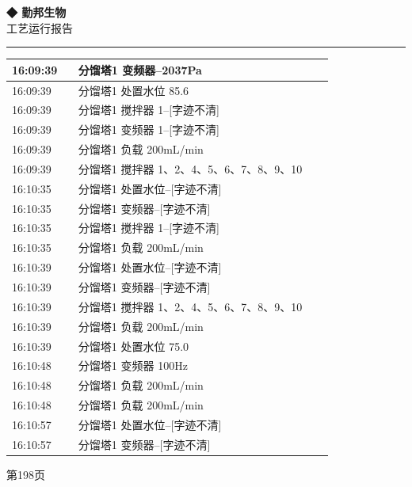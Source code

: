 \documentclass[UTF8,10pt,a4paper,fontset=fandol]{ctexart}
\begin{document}
\hfill
\begin{minipage}[t]{0.47\linewidth}
\centering
\textbf{◆ 勤邦生物}\\[2pt]
工艺运行报告\\[-2pt]
\rule{\linewidth}{0.4pt}

\scriptsize
\begin{tabular}{|p{0.19\linewidth}|p{0.73\linewidth}|}
\hline
16:09:39 & 分馏塔1 变频器--2037Pa \\ \hline
16:09:39 & 分馏塔1 处置水位 85.6 \\ \hline
16:09:39 & 分馏塔1 搅拌器 1--[字迹不清] \\ \hline
16:09:39 & 分馏塔1 变频器 1--[字迹不清] \\ \hline
16:09:39 & 分馏塔1 负载 200mL/min \\ \hline
16:09:39 & 分馏塔1 搅拌器 1、2、4、5、6、7、8、9、10 \\ \hline
16:10:35 & 分馏塔1 处置水位--[字迹不清] \\ \hline
16:10:35 & 分馏塔1 变频器--[字迹不清] \\ \hline
16:10:35 & 分馏塔1 搅拌器 1--[字迹不清] \\ \hline
16:10:35 & 分馏塔1 负载 200mL/min \\ \hline
16:10:39 & 分馏塔1 处置水位--[字迹不清] \\ \hline
16:10:39 & 分馏塔1 变频器--[字迹不清] \\ \hline
16:10:39 & 分馏塔1 搅拌器 1、2、4、5、6、7、8、9、10 \\ \hline
16:10:39 & 分馏塔1 负载 200mL/min \\ \hline
16:10:39 & 分馏塔1 处置水位 75.0 \\ \hline
16:10:48 & 分馏塔1 变频器 100Hz \\ \hline
16:10:48 & 分馏塔1 负载 200mL/min \\ \hline
16:10:48 & 分馏塔1 负载 200mL/min \\ \hline
16:10:57 & 分馏塔1 处置水位--[字迹不清] \\ \hline
16:10:57 & 分馏塔1 变频器--[字迹不清] \\ \hline
\end{tabular}

\vspace{2pt}
{\tiny 第198页}
\end{minipage}

\vspace{8pt}
\end{document}
